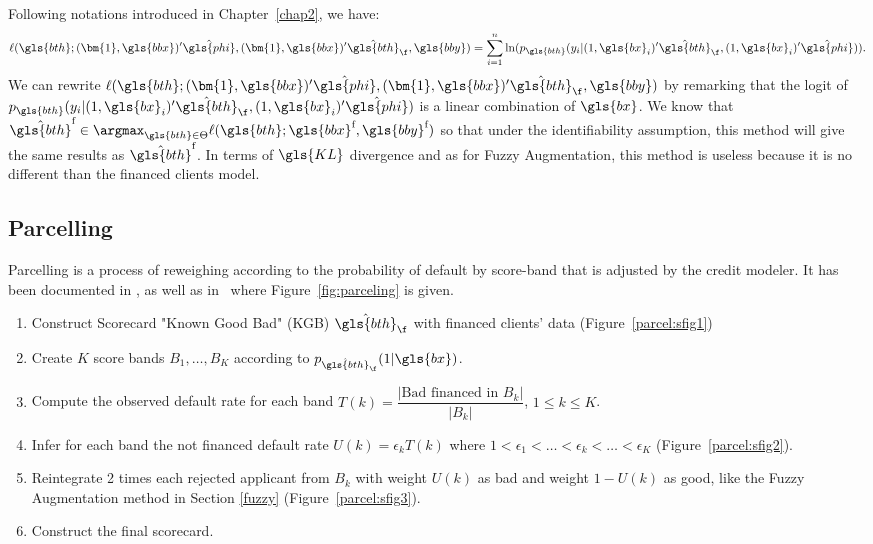Following notations introduced in Chapter~\ref{chap2}, we have:
\[ \ell(\gls{bth};(\bm{1},\gls{bbx})' \hat{\gls{phi}}, (\bm{1},\gls{bbx})' \hat{\gls{bth}}_\f, \gls{bby}) = \sum_{i=1}^{n} \ln(p_{\gls{bth}}(y_i | (1, \gls{bx}_i)' \hat{\gls{bth}}_{\f}, (1, \gls{bx}_i)' \hat{\gls{phi}})).\]
We can rewrite $\ell(\gls{bth};(\bm{1},\gls{bbx})' \hat{\gls{phi}}, (\bm{1},\gls{bbx})' \hat{\gls{bth}}_\f, \gls{bby})$ by remarking that the logit of $p_{\gls{bth}}(y_i | (1, \gls{bx}_i)' \hat{\gls{bth}}_{\f}, (1, \gls{bx}_i)' \hat{\gls{phi}})$ is a linear combination of $\gls{bx}$.
We know that $\hat{\gls{bth}}^{\text{f}} \in \argmax_{\gls{bth} \in \Theta} \ell(\gls{bth};\gls{bbx}^{\text{f}},\gls{bby}^{\text{f}})$ so that under the identifiability assumption, this method will give the same results as $\hat{\gls{bth}}^{\text{f}}$. In terms of $\gls{KL}$ divergence and as for Fuzzy Augmentation, this method is useless because it is no different than the financed clients model.

\subsection{Parcelling} \label{Parceling}

Parcelling is a process of reweighing according to the probability of default by score-band that is adjusted by the credit modeler. It has been documented in \cite{saporta,banasik,RI6}, as well as in~\cite{groupe} where Figure~\ref{fig:parceling} is given.

\begin{enumerate}
\item Construct Scorecard "Known Good Bad" (KGB) $\hat{\gls{bth}}_\f$ with financed clients' data (Figure~\ref{parcel:sfig1})
\item Create $K$ score bands $B_1, \ldots, B_K$ according to $p_{\hat{\gls{bth}}_\f}(1 | \gls{bx})$.
\item Compute the observed default rate for each band $T(k) = \dfrac{|\text{Bad financed in } B_k|}{|B_k|}$, $1 \leq k  \leq K$.
\item Infer for each band the not financed default rate $U(k) = \epsilon_k T(k)$ where $1 < \epsilon_1 < \ldots < \epsilon_k < \ldots < \epsilon_K$ (Figure~\ref{parcel:sfig2}).
\item Reintegrate 2 times each rejected applicant from $B_k$ with weight $U(k)$ as bad and weight $1-U(k)$ as good, like the Fuzzy Augmentation method in Section \ref{fuzzy} (Figure~\ref{parcel:sfig3}).
\item Construct the final scorecard.
\end{enumerate}

